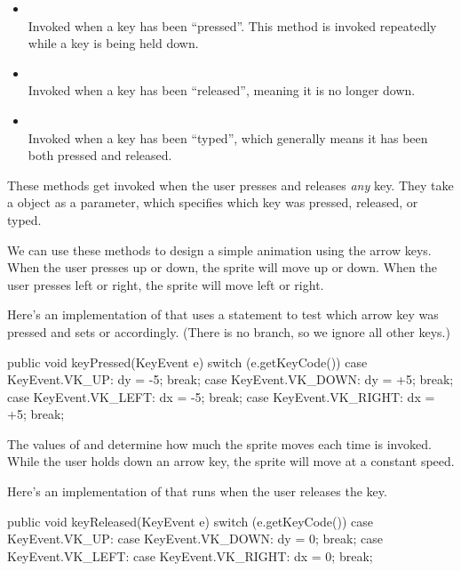 \begin{itemize}

\item {}
\\ Invoked when a key has been ``pressed''.
This method is invoked repeatedly while a key is being held down.

\item {}
\\ Invoked when a key has been ``released'', meaning it is no longer down.

\item {}
\\ Invoked when a key has been ``typed'', which generally means it has been both pressed and released.

\end{itemize}

These methods get invoked when the user presses and releases {\em any} key.
They take a  object as a parameter, which specifies which key was pressed, released, or typed.

We can use these methods to design a simple animation using the arrow keys.
When the user presses up or down, the sprite will move up or down.
When the user presses left or right, the sprite will move left or right.

Here's an implementation of  that uses a  statement to test which arrow key was pressed and sets  or  accordingly.
(There is no  branch, so we ignore all other keys.)

\begin{code}
public void keyPressed(KeyEvent e) {
    switch (e.getKeyCode()) {
        case KeyEvent.VK_UP:
            dy = -5;
            break;
        case KeyEvent.VK_DOWN:
            dy = +5;
            break;
        case KeyEvent.VK_LEFT:
            dx = -5;
            break;
        case KeyEvent.VK_RIGHT:
            dx = +5;
            break;
    }
}
\end{code}

The values of  and  determine how much the sprite moves each time  is invoked.
While the user holds down an arrow key, the sprite will move at a constant speed.

Here's an implementation of  that runs when the user releases the key.

\begin{code}
public void keyReleased(KeyEvent e) {
    switch (e.getKeyCode()) {
        case KeyEvent.VK_UP:
        case KeyEvent.VK_DOWN:
            dy = 0;
            break;
        case KeyEvent.VK_LEFT:
        case KeyEvent.VK_RIGHT:
            dx = 0;
            break;
    }
}
\end{code}


